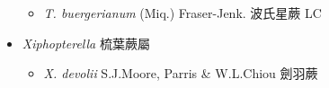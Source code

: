 \begin{itemize}
  \begin{itemize}
        \item[] \textit{T. buergerianum} (Miq.) Fraser-Jenk.  波氏星蕨   LC
  \end{itemize}
 \item[] \textit{Xiphopterella} 梳葉蕨屬
                                
  \begin{itemize}
        \item[] \textit{X. devolii} S.J.Moore, Parris \& W.L.Chiou  劍羽蕨   
  \end{itemize}
  \end{itemize}
